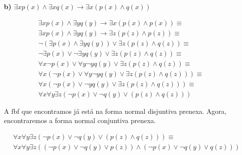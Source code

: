 \textbf{b) $\exists x p(x) \land \exists x q(x) \rightarrow \exists x (p(x) \land q(x)) $}

\begin{align*}
	\exists x p(x) \land \exists y q(y) \rightarrow \exists x (p(x) \land p(x)) \equiv                                 \\
	\exists x p(x) \land \exists y q(y) \rightarrow \exists z (p(z) \land p(z)) \equiv  &  & \tag*{Renom.}             \\
	\lnot (\exists p (x) \land \exists y q(y)) \lor \exists z (p(z) \land q(z))  \equiv &  & \tag*{Rem. $\rightarrow$} \\
	\lnot \exists p (x) \lor \lnot \exists y q(y) \lor \exists z (p(z) \land q(z)) \equiv                              \\
	\forall x \lnot p (x) \lor \forall y \lnot y q(y) \lor \exists z (p(z) \land q(z)) \equiv                          \\
	\forall x (\lnot p (x) \lor \forall y \lnot y q(y) \lor \exists z (p(z) \land q(z))) \equiv                        \\
	\forall x (\lnot p (x) \lor \lnot y q(y) \lor \exists z (p(z) \land q(z)))  \equiv                                 \\
	\forall x \forall y \exists z (\lnot p (x) \lor \lnot q(y) \lor (p(z) \land q(z)))
\end{align*}

A fbf que encontramos já está na forma normal disjuntiva prenexa.
Agora, encontraremos a forma normal conjuntiva prenexa.

\begin{align*}
	\forall x \forall y \exists z (\lnot p (x) \lor \lnot q(y) \lor (p(z) \land q(z))) \equiv \\
	\forall x \forall y \exists z ((\lnot p(x) \lor \lnot q(y) \lor p(z)) \land (\lnot p(x) \lor \lnot q(y) \lor q(z)))
\end{align*}
